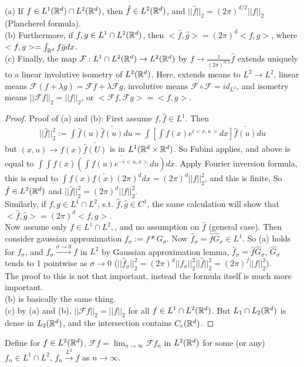 \documentclass[a4paper]{article}
\begin{document}
\begin{thm}
(a) If $f \in L^1(\mathbb{R}^d) \cap L^2(\mathbb{R}^d)$, then $\hat{f} \in L^2(\mathbb{R}^d)$, and $||\hat{f}||_2 = (2\pi)^{d/2} ||f||_2$ (Plancherel formula).\\
(b) Furthermore, if $f,g \in L^1 \cap L^2 (\mathbb{R}^d)$, then $<\hat{f},\hat{g}> = (2\pi)^d <f,g>$, where $<f,g> = \int_{\mathbb{R}^d} f \bar{g} dx$.\\
(c) Finally, the map $\mathcal{F}: L^1\cap L^2 (\mathbb{R}^d) \to L^2(\mathbb{R}^d)$ by $f \to \frac{1}{(2\pi)^{d/2}} \hat{f}$ extends uniquely to a linear involutive isometry of $L^2(\mathbb{R}^d)$. Here, extends means to $L^2 \to L^2$, linear means $\mathcal{F} (f+\lambda g) = \mathcal{F} f + \lambda \mathcal{F} g$, involutive means $\mathcal{F} \circ \mathcal{F} = id_{L^2}$, and isometry means $||\mathcal{F} f||_2 = ||f||_2$, or $<\mathcal{F} f, \mathcal{F} g> = <f,g>$.
\begin{proof}
Proof of (a) and (b): First assume $f,\hat{f} \in L^1$. Then 
\begin{equation*}
\begin{aligned}
||\hat{f}||_2^2 := \int \hat{f}(u) \bar{\hat{f}(u)}du =\int [\int f(x) e^{i<x,u>} dx] \bar{\hat{f}(u)}du
\end{aligned}
\end{equation*}
but $(x,u) \to f(x) \bar{\hat{f}(U)}$ is in $L^1 (\mathbb{R}^d \times \mathbb{R}^d)$. So Fubini applies, and above is equal to $\int\int f(x) \overline{(\int \hat{f}(u) e^{-i<u,x>}du)} dx$. Apply Fourier inversion formula, this is equal to $\int f(x) \bar{f(x)} (2\pi)^d dx = (2\pi)^d ||f||_2^2$, and this is finite. So $\hat{f} \in L^2(\mathbb{R}^d)$ and $||\hat{f}||_2^2 =(2\pi)^d ||f||_2^2$.\\
Similarly, if $f,g \in L^1 \cap L^2$, s.t. $\hat{f},\hat{g} \in C^1$, the same calculation will show that $<\hat{f},\hat{g}> = (2\pi)^d <f,g>$.\\
Now assume only $f \in L^1 \cap L^2,$, and no assumption on $\hat{f}$ (general case). Then consider gaussian approximation $f_\sigma := f*G_\sigma$. Now $\hat{f}_\sigma=\hat{f}\hat{G}_\sigma \in L^1$. So (a) holds for $f_\sigma$, and $f_\sigma \xrightarrow{\sigma \to 0} f$ in $L^2$ by Gaussian approximation lemma, $\hat{f}_\sigma = \hat{f} \hat{G}_\sigma$, $\hat{G}_\sigma$ tends to 1 pointwise as $\sigma \to 0$ ($||\hat{f}_\sigma||_2^2 = (2\pi)^d ||f_\sigma||_2^2 ||\hat{f}||_2^2 = (2\pi)^f ||f||_2^2$).\\
The proof to this is not that important, instead the formula itself is much more important.\\
(b) is basically the same thing.\\
(c) by (a) and (b), $||\mathcal{F} f||_2 = ||f||_2$ for all $f \in L^1 \cap L^2(\mathbb{R}^d)$. But $L_1 \cap L_2(\mathbb{R}^d)$ is dense in $L_2(\mathbb{R}^d)$, and the intersection contains $C_c(\mathbb{R}^d)$.
\end{proof}
\end{thm}

Define for $f \in L^2 (\mathbb{R}^d)$, $\mathcal{F} f =\lim_{n \to \infty} \mathcal{F} f_n$ in $L^2(\mathbb{R}^d)$ for some (or any) $f_n \in L^1 \cap L^2$, $f_n \xrightarrow{L^2} f$ as $n \to \infty$.
\end{document}
